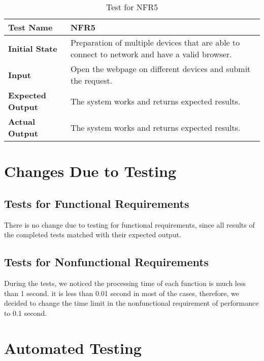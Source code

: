 \documentclass[12pt, titlepage]{article}
\begin{document}
		\begin{table}[H]
			
			\begin{tabular}[r]{|l|p{10cm}|}
				
				\hline
				
				\textbf{Test Name} & NFR5 \\ 
				\hline
				\textbf{Initial State} & Preparation of multiple devices that are able to connect to network and have a valid browser.\\ 
				\hline
				\textbf{Input} & Open the webpage on different devices and submit the request. \\ 
				\hline 
				\textbf{Expected Output} & The system works and returns expected results.  \\ 
				\hline
				\textbf{Actual Output} & The system works and returns expected results.  \\ 
				\hline
				
			\end{tabular}
			\caption{Test for NFR5}
			\label{Table}
		\end{table}
		


\section{Changes Due to Testing}

\subsection{Tests for Functional Requirements}

    There is no change due to testing for functional requirements, since all results of the completed tests matched with their expected output.

\subsection{Tests for Nonfunctional Requirements}

    During the tests, we noticed the processing time of each function is much less than 1 second. it is less than 0.01 second in most of the cases, therefore, we decided to change the time limit in the nonfunctional requirement of performance to 0.1 second. 

\section{Automated Testing}
\end{document}
